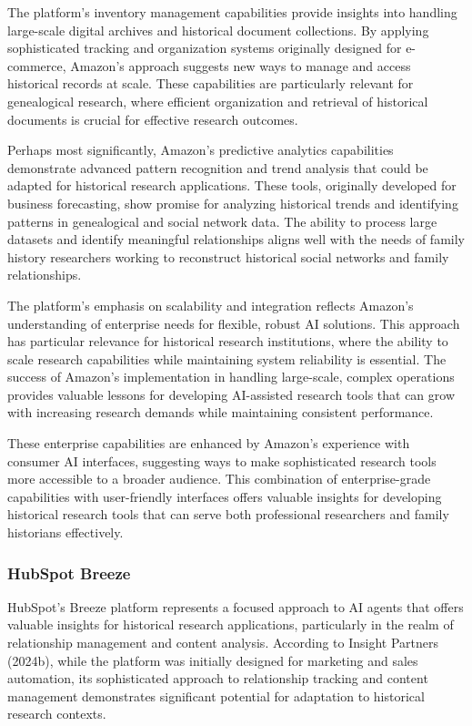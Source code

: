 \documentclass[
]{article}
\begin{document}
The platform's inventory management capabilities provide insights into
handling large-scale digital archives and historical document
collections. By applying sophisticated tracking and organization systems
originally designed for e-commerce, Amazon's approach suggests new ways
to manage and access historical records at scale. These capabilities are
particularly relevant for genealogical research, where efficient
organization and retrieval of historical documents is crucial for
effective research outcomes.

Perhaps most significantly, Amazon's predictive analytics capabilities
demonstrate advanced pattern recognition and trend analysis that could
be adapted for historical research applications. These tools, originally
developed for business forecasting, show promise for analyzing
historical trends and identifying patterns in genealogical and social
network data. The ability to process large datasets and identify
meaningful relationships aligns well with the needs of family history
researchers working to reconstruct historical social networks and family
relationships.

The platform's emphasis on scalability and integration reflects Amazon's
understanding of enterprise needs for flexible, robust AI solutions.
This approach has particular relevance for historical research
institutions, where the ability to scale research capabilities while
maintaining system reliability is essential. The success of Amazon's
implementation in handling large-scale, complex operations provides
valuable lessons for developing AI-assisted research tools that can grow
with increasing research demands while maintaining consistent
performance.

These enterprise capabilities are enhanced by Amazon's experience with
consumer AI interfaces, suggesting ways to make sophisticated research
tools more accessible to a broader audience. This combination of
enterprise-grade capabilities with user-friendly interfaces offers
valuable insights for developing historical research tools that can
serve both professional researchers and family historians effectively.

\subsubsection{HubSpot Breeze}\label{hubspot-breeze}

HubSpot's Breeze platform represents a focused approach to AI agents
that offers valuable insights for historical research applications,
particularly in the realm of relationship management and content
analysis. According to Insight Partners (2024b), while the platform was
initially designed for marketing and sales automation, its sophisticated
approach to relationship tracking and content management demonstrates
significant potential for adaptation to historical research contexts.
\end{document}

